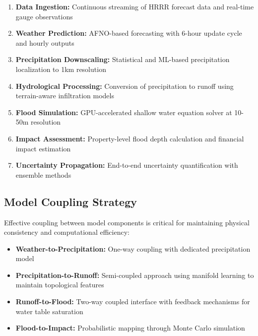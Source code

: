 \documentclass{article}
\begin{document}
\begin{enumerate}
    \item \textbf{Data Ingestion:} Continuous streaming of HRRR forecast data and real-time gauge observations
    
    \item \textbf{Weather Prediction:} AFNO-based forecasting with 6-hour update cycle and hourly outputs
    
    \item \textbf{Precipitation Downscaling:} Statistical and ML-based precipitation localization to 1km resolution
    
    \item \textbf{Hydrological Processing:} Conversion of precipitation to runoff using terrain-aware infiltration models
    
    \item \textbf{Flood Simulation:} GPU-accelerated shallow water equation solver at 10-50m resolution
    
    \item \textbf{Impact Assessment:} Property-level flood depth calculation and financial impact estimation
    
    \item \textbf{Uncertainty Propagation:} End-to-end uncertainty quantification with ensemble methods
\end{enumerate}

\subsection{Model Coupling Strategy}

Effective coupling between model components is critical for maintaining physical consistency and computational efficiency:

\begin{itemize}
    \item \textbf{Weather-to-Precipitation:} One-way coupling with dedicated precipitation model
    
    \item \textbf{Precipitation-to-Runoff:} Semi-coupled approach using manifold learning to maintain topological features
    
    \item \textbf{Runoff-to-Flood:} Two-way coupled interface with feedback mechanisms for water table saturation
    
    \item \textbf{Flood-to-Impact:} Probabilistic mapping through Monte Carlo simulation
\end{itemize}
\end{document}
